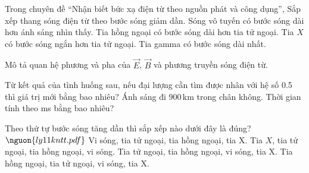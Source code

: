 \begin{ex}
Trong chuyên đề “Nhận biết bức xạ điện từ theo nguồn phát và công dụng”, Sắp xếp thang sóng điện từ theo bước sóng giảm dần.
\choiceTF
{\True Sóng vô tuyến có bước sóng dài hơn ánh sáng nhìn thấy.}
{\True Tia hồng ngoại có bước sóng dài hơn tia tử ngoại.}
{\True Tia $X$ có bước sóng ngắn hơn tia tử ngoại.}
{Tia gamma có bước sóng dài nhất.}
\end{ex}

\begin{bt}
Mô tả quan hệ phương và pha của $\vec E$, $\vec B$ và phương truyền sóng điện từ.
\end{bt}

\begin{ex}
Từ kết quả của tình huống sau, nếu đại lượng cần tìm được nhân với hệ số 0.5 thì giá trị mới bằng bao nhiêu? Ánh sáng đi $900\,\text{km}$ trong chân không. Thời gian tính theo ms bằng bao nhiêu?
\end{ex}

\begin{ex}
Theo thứ tự bước sóng tăng dần thì sắp xếp nào dưới đây là đúng? $\nguon{ly11 kntt.pdf}$
\choice
{Vi sóng, tia tử ngoại, tia hồng ngoại, tia X.}
{\True Tia $X$, tia tử ngoại, tia hồng ngoại, vi sóng.}
{Tia tử ngoại, tia hồng ngoại, vi sóng, tia X.}
{Tia hồng ngoại, tia tử ngoại, vi sóng, tia X.}
\end{ex}

